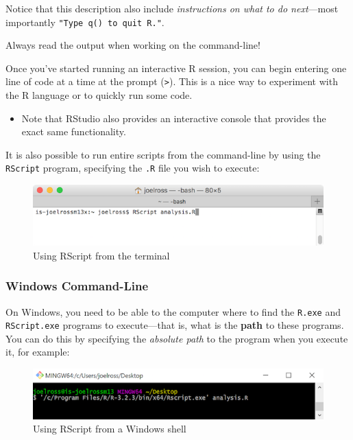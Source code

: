 \documentclass[]{book}
\providecommand{\tightlist}{%
  \setlength{\itemsep}{0pt}\setlength{\parskip}{0pt}}
\theoremstyle{definition}
\theoremstyle{definition}
\theoremstyle{remark}
\begin{document}
Notice that this description also include \emph{instructions on what to
do next}---most importantly
\texttt{"Type\ \textquotesingle{}q()\textquotesingle{}\ to\ quit\ R."}.

Always read the output when working on the command-line!

Once you've started running an interactive R session, you can begin
entering one line of code at a time at the prompt
(\texttt{\textgreater{}}). This is a nice way to experiment with the R
language or to quickly run some code.

\begin{itemize}
\tightlist
\item
  Note that RStudio also provides an interactive console that provides
  the exact same functionality.
\end{itemize}

It is also possible to run entire scripts from the command-line by using
the \texttt{RScript} program, specifying the \texttt{.R} file you wish
to execute:

\begin{figure}
\centering
\includegraphics{img/r-intro/rscript-terminal.png}
\caption{Using RScript from the terminal}
\end{figure}

\subsubsection{Windows Command-Line}\label{windows-command-line}

On Windows, you need to be able to the computer where to find the
\texttt{R.exe} and \texttt{RScript.exe} programs to execute---that is,
what is the \textbf{path} to these programs. You can do this by
specifying the \emph{absolute path} to the program when you execute it,
for example:

\begin{figure}
\centering
\includegraphics{img/r-intro/rscript-terminal-windows.png}
\caption{Using RScript from a Windows shell}
\end{figure}
\end{document}

